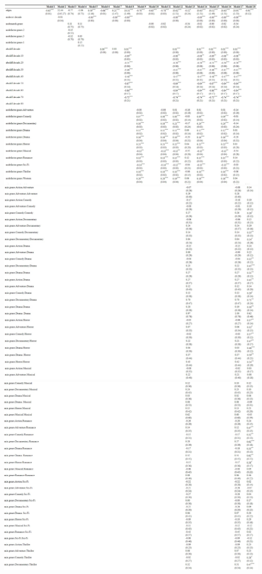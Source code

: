 \documentclass[
  man]{apa6}
\begin{document}
\includegraphics{ergm_images/model_result1.jpeg}
\includegraphics{ergm_images/model_result2.jpeg}
\includegraphics{ergm_images/model_result3.jpeg}
\end{document}
